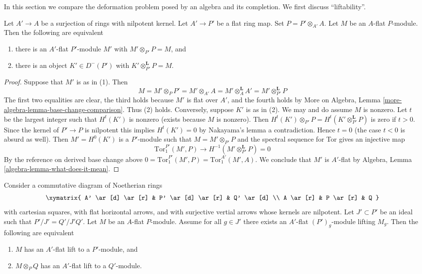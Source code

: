 \noindent
In this section we compare the deformation problem posed
by an algebra and its completion.
We first discuss ``liftability''.

\begin{lemma}
\label{lemma-lift-equivalence-module-derived}
Let $A' \to A$ be a surjection of rings with nilpotent kernel.
Let $A' \to P'$ be a flat ring map.
Set $P = P' \otimes_{A'} A$.
Let $M$ be an $A$-flat $P$-module.
Then the following are equivalent
\begin{enumerate}
\item there is an $A'$-flat $P'$-module $M'$ with
$M' \otimes_{P'} P = M$, and
\item there is an object $K' \in D^-(P')$ with
$K' \otimes_{P'}^\mathbf{L} P = M$.
\end{enumerate}
\end{lemma}

\begin{proof}
Suppose that $M'$ is as in (1). Then
$$
M = M' \otimes_P P' = M' \otimes_{A'} A =
M' \otimes_A^\mathbf{L} A' = M' \otimes_{P'}^\mathbf{L} P
$$
The first two equalities are clear, the third holds because
$M'$ is flat over $A'$, and the fourth holds by
More on Algebra, Lemma \ref{more-algebra-lemma-base-change-comparison}.
Thus (2) holds. Conversely, suppose $K'$ is as in (2).
We may and do assume $M$ is nonzero.
Let $t$ be the largest integer such that $H^t(K')$ is nonzero
(exists because $M$ is nonzero).
Then $H^t(K') \otimes_{P'} P = H^t(K' \otimes_{P'}^\mathbf{L} P)$
is zero if $t > 0$. Since the kernel of $P' \to P$ is nilpotent
this implies $H^t(K') = 0$ by Nakayama's lemma a contradiction.
Hence $t = 0$ (the case $t < 0$ is absurd as well).
Then $M' = H^0(K')$ is a $P'$-module such that $M = M' \otimes_{P'} P$
and the spectral sequence for Tor gives an injective map
$$
\text{Tor}_1^{P'}(M', P) \to H^{-1}(M' \otimes_{P'}^\mathbf{L} P) = 0
$$
By the reference on derived base change above
$0 = \text{Tor}_1^{P'}(M', P) = \text{Tor}_1^{A'}(M', A)$.
We conclude that $M'$ is $A'$-flat by
Algebra, Lemma \ref{algebra-lemma-what-does-it-mean}.
\end{proof}

\begin{lemma}
\label{lemma-lift-equivalence-module}
Consider a commutative diagram of Noetherian rings
$$
\xymatrix{
A' \ar[d] \ar[r] &
P' \ar[d] \ar[r] &
Q' \ar[d] \\
A \ar[r] &
P \ar[r] &
Q
}
$$
with cartesian squares, with flat horizontal arrows, and with
surjective vertial arrows whose kernels are nilpotent.
Let $J' \subset P'$ be an ideal such that $P'/J' = Q'/J'Q'$.
Let $M$ be an $A$-flat $P$-module.
Assume for all $g \in J'$ there exists an $A'$-flat $(P')_g$-module
lifting $M_g$. Then the following are equivalent
\begin{enumerate}
\item $M$ has an $A'$-flat lift to a $P'$-module, and
\item $M \otimes_P Q$ has an $A'$-flat lift to a $Q'$-module.
\end{enumerate}
\end{lemma}

